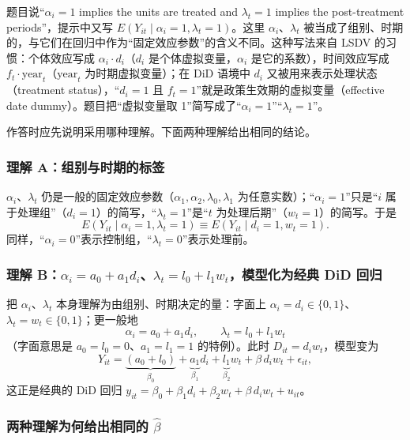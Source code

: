 题目说“$\alpha_i=1$ implies the units are treated and $\lambda_t=1$ implies the post-treatment periods”，提示中又写 $E(Y_{it}\mid\alpha_i=1,\lambda_t=1)$。这里 $\alpha_i$、$\lambda_t$ 被当成了组别、时期的，与它们在回归中作为“固定效应参数”的含义不同。这种写法来自 LSDV 的习惯：个体效应写成 $\alpha_i\cdot d_i$（$d_i$ 是个体虚拟变量，$\alpha_i$ 是它的系数），时间效应写成 $f_t\cdot\text{year}_t$（$\text{year}_t$ 为时期虚拟变量）；在 DiD 语境中 $d_i$ 又被用来表示处理状态（treatment status），“$d_i=1$ 且 $f_t=1$”就是政策生效期的虚拟变量（effective date dummy）。题目把“虚拟变量取 1”简写成了“$\alpha_i=1$”“$\lambda_t=1$”。

作答时应先说明采用哪种理解。下面两种理解给出相同的结论。

\subsubsection{理解 A：组别与时期的标签}

\begin{defn}[理解 A：标签 / 条件记号]\label{def:U17b-A}
$\alpha_i$、$\lambda_t$ 仍是一般的固定效应参数（$\alpha_1,\alpha_2,\lambda_0,\lambda_1$ 为任意实数）；“$\alpha_i=1$”只是“$i$ 属于处理组”（$d_i=1$）的简写，“$\lambda_t=1$”是“$t$ 为处理后期”（$w_t=1$）的简写。于是
\[
E(Y_{it}\mid\alpha_i=1,\lambda_t=1)\equiv E(Y_{it}\mid d_i=1,w_t=1).
\]
同样，“$\alpha_i=0$”表示控制组，“$\lambda_t=0$”表示处理前。
\end{defn}

\subsubsection{理解 B：\texorpdfstring{$\alpha_i=a_0+a_1d_i$、$\lambda_t=l_0+l_1w_t$}{alpha\_i = a0 + a1 d\_i, lambda\_t = l0 + l1 w\_t}，模型化为经典 DiD 回归}

\begin{defn}[理解 B：虚拟变量]\label{def:U17b-B}
把 $\alpha_i$、$\lambda_t$ 本身理解为由组别、时期决定的量：字面上 $\alpha_i=d_i\in\{0,1\}$、$\lambda_t=w_t\in\{0,1\}$；更一般地
\[
\alpha_i=a_0+a_1d_i,\qquad \lambda_t=l_0+l_1w_t
\]
（字面意思是 $a_0=l_0=0$、$a_1=l_1=1$ 的特例）。此时 $D_{it}=d_iw_t$，模型变为
\[
Y_{it}=\underbrace{(a_0+l_0)}_{\beta_0}+\underbrace{a_1}_{\beta_1}d_i+\underbrace{l_1}_{\beta_2}w_t+\beta\,d_iw_t+\epsilon_{it},
\]
这正是经典的 DiD 回归 $y_{it}=\beta_0+\beta_1d_i+\beta_2w_t+\beta\,d_iw_t+u_{it}$。
\end{defn}

\subsubsection{两种理解为何给出相同的 \texorpdfstring{$\hat\beta$}{beta hat}}


